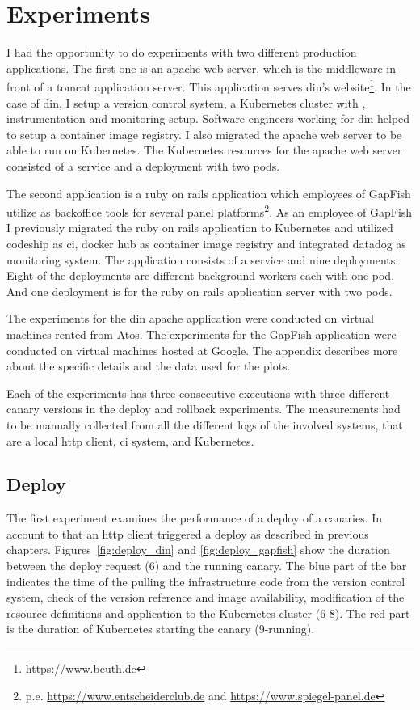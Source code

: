 \section{Experiments}

I had the opportunity to do experiments with two different production applications. The
first one is an apache web server, which is the middleware in front of a tomcat application
server. This application serves \gls{din}'s
website\footnote{\url{https://www.beuth.de}}. In the case of \gls{din}, I setup a version
control system, a Kubernetes cluster with \deployer, instrumentation and monitoring
setup. Software engineers working for \gls{din} helped to setup a container image
registry. I also migrated the apache web server to be able to run on Kubernetes. The
Kubernetes resources for the apache web server consisted of a service and a deployment with
two pods.

The second application is a ruby on rails application which employees of GapFish utilize
as backoffice tools for several panel
platforms\footnote{p.e. \url{https://www.entscheiderclub.de} and
  \url{https://www.spiegel-panel.de}}. As an employee of GapFish I previously migrated the
ruby on rails application to Kubernetes and utilized codeship as \gls{ci}, docker hub as
container image registry and integrated datadog as monitoring system. The application
consists of a service and nine deployments. Eight of the deployments are different
background workers each with one pod. And one deployment is for the ruby on rails
application server with two pods.

The experiments for the \gls{din} apache application were conducted on virtual machines
rented from Atos. The experiments for the GapFish application were conducted on virtual
machines hosted at Google. The appendix describes more about the specific details and the
data used for the plots.

Each of the experiments has three consecutive executions with three different canary
versions in the deploy and rollback experiments. The measurements had to be manually
collected from all the different logs of the involved systems, that are a local http
client, \gls{ci} system, \deployer and Kubernetes.

\subsection{Deploy}

The first experiment examines the performance of a deploy of a canaries. In account to
that an http client triggered a deploy as described in previous
chapters. Figures~\ref{fig:deploy_din} and \ref{fig:deploy_gapfish} show the duration
between the deploy request (6) and the running canary. The blue part of the bar indicates
the time of the \deployer pulling the infrastructure code from the version control system,
check of the version reference and image availability, modification of the resource
definitions and application to the Kubernetes cluster (6-8). The red part is the duration
of Kubernetes starting the canary (9-running).

